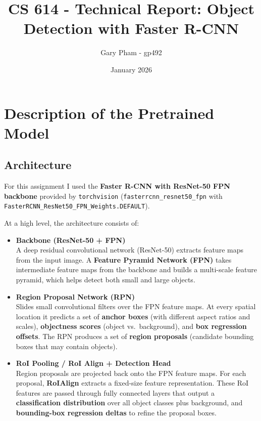 \documentclass[11pt]{article}
\title{CS 614 - Technical Report: Object Detection with Faster R-CNN}
\author{Gary Pham - gp492}
\date{January 2026}
\begin{document}
\maketitle

\section{Description of the Pretrained Model}

\subsection{Architecture}

For this assignment I used the \textbf{Faster R-CNN with ResNet-50 FPN backbone} provided by \texttt{torchvision} (\texttt{fasterrcnn\_resnet50\_fpn} with \texttt{FasterRCNN\_ResNet50\_FPN\_Weights.DEFAULT}).

At a high level, the architecture consists of:

\begin{itemize}
  \item \textbf{Backbone (ResNet-50 + FPN)} \\
    A deep residual convolutional network (ResNet-50) extracts feature maps from the input image. A \textbf{Feature Pyramid Network (FPN)} takes intermediate feature maps from the backbone and builds a multi-scale feature pyramid, which helps detect both small and large objects.

  \item \textbf{Region Proposal Network (RPN)} \\
    Slides small convolutional filters over the FPN feature maps. At every spatial location it predicts a set of \textbf{anchor boxes} (with different aspect ratios and scales), \textbf{objectness scores} (object vs.\ background), and \textbf{box regression offsets}. The RPN produces a set of \textbf{region proposals} (candidate bounding boxes that may contain objects).

  \item \textbf{RoI Pooling / RoI Align + Detection Head} \\
    Region proposals are projected back onto the FPN feature maps. For each proposal, \textbf{RoIAlign} extracts a fixed-size feature representation. These RoI features are passed through fully connected layers that output a \textbf{classification distribution} over all object classes plus background, and \textbf{bounding-box regression deltas} to refine the proposal boxes.
\end{itemize}
\end{document}
